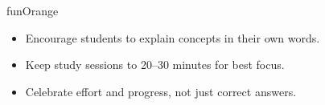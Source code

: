 {\begin{center}
\begin{minipage}{0.84\textwidth}
\begin{sgInfoPanel}{funOrange}
    \vspace{2mm}

    \begin{itemize}[leftmargin=1.2em, itemsep=2pt]
        \item[\textcolor{funOrangeDark}{\faAngleDoubleRight}]
            Encourage students to explain concepts in their own words.
        \item[\textcolor{funOrangeDark}{\faAngleDoubleRight}]
            Keep study sessions to 20--30 minutes for best focus.
        \item[\textcolor{funOrangeDark}{\faAngleDoubleRight}]
            Celebrate effort and progress, not just correct answers.
    \end{itemize}
\end{sgInfoPanel}
\end{minipage}
\end{center}

}

\clearpage
